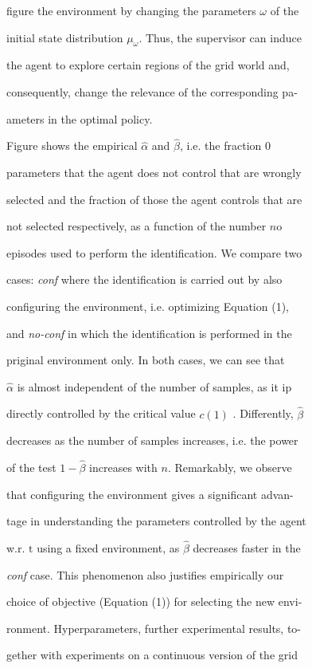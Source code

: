 \documentclass[a4paper,12pt]{article}
\begin{document}
figure the environment by changing the parameters $\omega$ of the

initial state distribution $\mu_{\omega}$. Thus, the supervisor can induce

the agent to explore certain regions of the grid world and,

consequently, change the relevance of the corresponding pa-

ameters in the optimal policy.

Figure shows the empirical $\hat{\alpha}$ and $\hat{\beta}$, i.e. the fraction $0$

parameters that the agent does not control that are wrongly

selected and the fraction of those the agent controls that are

not selected respectively, as a function of the number $n\mathrm{o}$

episodes used to perform the identification. We compare two

cases: {\it conf} where the identification is carried out by also

configuring the environment, i.e. optimizing Equation (1),

and {\it no-conf} in which the identification is performed in the

priginal environment only. In both cases, we can see that

$\hat{\alpha}$ is almost independent of the number of samples, as it ip

directly controlled by the critical value $c(1)$ . Differently, $\hat{\beta}$

decreases as the number of samples increases, i.e. the power

of the test $1-\hat{\beta}$ increases with $n$. Remarkably, we observe

that configuring the environment gives a significant advan-

tage in understanding the parameters controlled by the agent

w.r. $\mathrm{t}$ using a fixed environment, as $\hat{\beta}$ decreases faster in the

{\it conf} case. This phenomenon also justifies empirically our

choice of objective (Equation (1)) for selecting the new envi-

ronment. Hyperparameters, further experimental results, to-

gether with experiments on a continuous version of the grid
\end{document}
